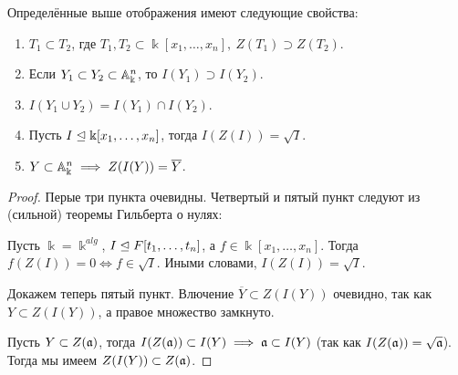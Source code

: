 	\begin{statement}\label{ag_prop_1} 
		Определённые выше отображения имеют следующие свойства: 
		\begin{enumerate}
		\item $T_1 \subset T_2$, где $T_1, T_2 \subset \Bbbk[x_1, \ldots, x_n], \ Z(T_1) \supset Z(T_2)$.

		\item Если $Y_1 \subset Y_2 \subset \AA_{\Bbbk}^n$, то $I(Y_1) \supset I(Y_2)$.

		\item $I(Y_1 \cup Y_2) = I(Y_1) \cap I(Y_2)$.

		\item Пусть $I \lei \Bbbk[x_1, \ldots, x_n]$, тогда $I(Z(I)) = \sqrt{I}$.

		\item $Y \subset \AA_{\Bbbk}^n \implies Z(I(Y)) = \overline{Y}$.

	\end{enumerate}		
	\end{statement}	
	\begin{proof}
		Перые три пункта очевидны. Четвертый и пятый пункт следуют из (сильной) теоремы Гильберта о нулях: 

		\begin{theorem}
			Пусть $\Bbbk = \Bbbk^{alg}$, $I \lei F[t_{1}, \ldots, t_{n}]$, а $f \in \Bbbk[x_{1}, \ldots, x_{n}]$. Тогда 
			$f(Z(I)) = 0 \Leftrightarrow f \in \sqrt{I}$. Иными словами, $I(Z(I)) = \sqrt{I}$.
		\end{theorem}

		Докажем теперь пятый пункт. Влючение $\overline{Y} \subset Z(I(Y))$ очевидно, так как 
		$Y \subset Z(I(Y))$, а правое множество замкнуто. 

		Пусть $Y \subset Z(\fa)$, тогда $I(Z(\fa)) \subset I(Y) \implies \fa \subset I(Y)$ (так как $I(Z(\fa)) = \sqrt{\fa}$). Тогда мы имеем $Z(I(Y)) \subset Z(\fa)$. 
	\end{proof}

